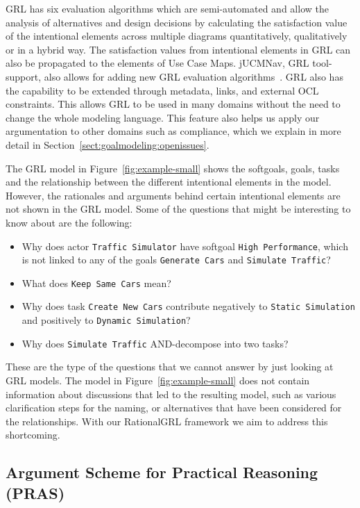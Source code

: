 GRL has six evaluation algorithms which are semi-automated and allow the analysis of alternatives and design decisions by calculating the satisfaction value of the intentional elements across multiple diagrams quantitatively, qualitatively or in a hybrid way. The satisfaction values from intentional elements in GRL can also be propagated to the elements of Use Case Maps. jUCMNav, GRL tool-support, also allows for adding new GRL evaluation algorithms~\cite{jUCMNav}. GRL also has the capability to be extended through metadata, links, and external OCL constraints. This allows GRL to be used in many domains without the need to change the whole modeling language. This feature also helps us apply our argumentation to other domains such as compliance, which we explain in more detail in Section~\ref{sect:goalmodeling:openissues}.

The GRL model in Figure~\ref{fig:example-small} shows the softgoals, goals, tasks and the relationship between the different intentional elements in the model. However, the rationales and arguments behind certain intentional elements are not shown in the GRL model. Some of the questions that might be interesting to know about are the following:

\begin{itemize}
	\item Why does actor \texttt{Traffic Simulator} have softgoal \texttt{High Performance}, which is not linked to any of the goals \texttt{Generate Cars} and \texttt{Simulate Traffic}? %
	\item What does \texttt{Keep Same Cars} mean?
	\item Why does task \texttt{Create New Cars} contribute negatively to \texttt{Static Simulation} and positively to \texttt{Dynamic Simulation}?
	\item Why does \texttt{Simulate Traffic} AND-decompose into two tasks?
\end{itemize}

These are the type of the questions that we cannot answer by just looking at GRL models. The model in Figure~\ref{fig:example-small} does not contain information about discussions that led to the resulting model, such as various clarification steps for the naming, or alternatives that have been considered for the relationships. With our RationalGRL framework we aim to address this shortcoming.

\subsection{Argument Scheme for Practical Reasoning (PRAS)}
\label{sect:background:pras}

